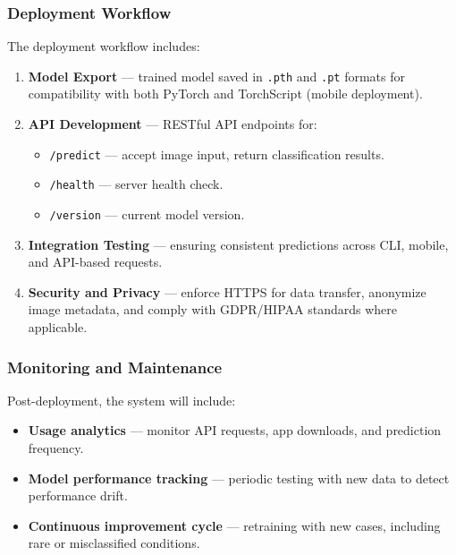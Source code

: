 \documentclass[
  12pt,
  oneside]{article}
\providecommand{\tightlist}{%
  \setlength{\itemsep}{0pt}\setlength{\parskip}{0pt}}
\begin{document}
\subsubsection{Deployment Workflow}\label{deployment-workflow}

The deployment workflow includes:

\begin{enumerate}
\def\labelenumi{\arabic{enumi}.}
\item
  \textbf{Model Export} --- trained model saved in \texttt{.pth} and
  \texttt{.pt} formats for compatibility with both PyTorch and
  TorchScript (mobile deployment).
\item
  \textbf{API Development} --- RESTful API endpoints for:

  \begin{itemize}
  \tightlist
  \item
    \texttt{/predict} --- accept image input, return classification
    results.
  \item
    \texttt{/health} --- server health check.
  \item
    \texttt{/version} --- current model version.
  \end{itemize}
\item
  \textbf{Integration Testing} --- ensuring consistent predictions
  across CLI, mobile, and API-based requests.
\item
  \textbf{Security and Privacy} --- enforce HTTPS for data transfer,
  anonymize image metadata, and comply with GDPR/HIPAA standards where
  applicable.
\end{enumerate}

\subsubsection{Monitoring and
Maintenance}\label{monitoring-and-maintenance}

Post-deployment, the system will include:

\begin{itemize}
\tightlist
\item
  \textbf{Usage analytics} --- monitor API requests, app downloads, and
  prediction frequency.
\item
  \textbf{Model performance tracking} --- periodic testing with new data
  to detect performance drift.
\item
  \textbf{Continuous improvement cycle} --- retraining with new cases,
  including rare or misclassified conditions.
\end{itemize}
\end{document}
